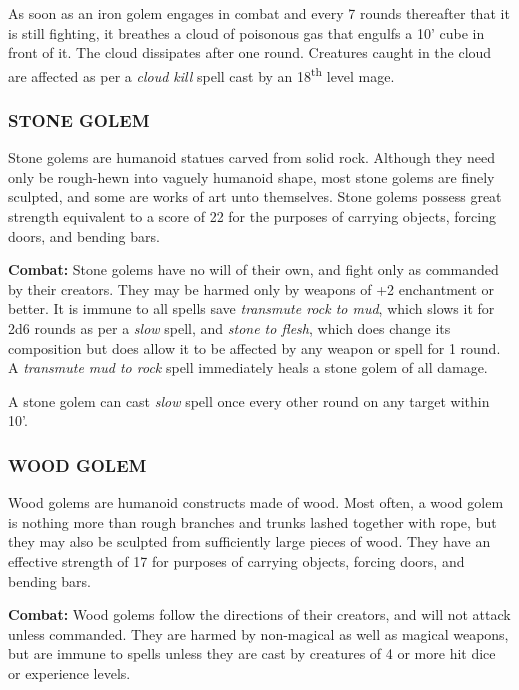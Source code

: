\begin{multicols}{2}
As soon as an iron golem engages in combat and every 7 rounds thereafter that it is still fighting, it breathes a cloud of poisonous gas that engulfs a 10' cube in front of it. The cloud dissipates after one round. Creatures caught in the cloud are affected as per a \textit{cloud kill} spell cast by an 18\textsuperscript{th} level mage.

\subsubsection{STONE GOLEM}

Stone golems are humanoid statues carved from solid rock. Although they need only be rough-hewn into vaguely humanoid shape, most stone golems are finely sculpted, and some are works of art unto themselves. Stone golems possess great strength equivalent to a score of  22 for the purposes of carrying objects, forcing doors, and bending bars.

\textbf{Combat:} Stone golems have no will of their own, and fight only as commanded by their creators. They may be harmed only by weapons of +2 enchantment or better. It is immune to all spells save \textit{transmute rock to mud}, which slows it for 2d6 rounds as per a \textit{slow} spell, and \textit{stone to flesh}, which does change its composition but does allow it to be affected by any weapon or spell for 1 round. A \textit{transmute mud to rock} spell immediately heals a stone golem of all damage.

A stone golem can cast \textit{slow} spell once every other round on any target within 10'.

\subsubsection{WOOD GOLEM}

Wood golems are humanoid constructs made of wood. Most often, a wood golem is nothing more than rough branches and trunks lashed together with rope, but they may also be sculpted from sufficiently large pieces of wood. They have an effective strength of 17 for purposes of carrying objects, forcing doors, and bending bars.

\textbf{Combat:} Wood golems follow the directions of their creators, and will not attack unless commanded. They are harmed by non-magical as well as magical weapons, but are immune to spells unless they are cast by creatures of 4 or more hit dice or experience levels.


\end{multicols}
